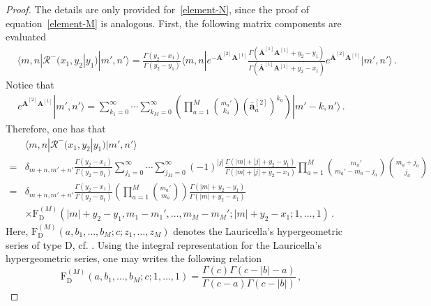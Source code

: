 \documentclass[11pt]{article}
\numberwithin{equation}{section}
\newcommand{\oad}{\mathbf{\bar{a}}}
\newcommand{\OF}{\mathbf{A}}
\newcommand{\OFD}{\mathbf{\bar{A}}}
\newcommand{\M}{M}
\newcommand{\eR}{\mathcal{R}}
\begin{document}
\begin{proof}
The details are only provided for~\eqref{element-N}, since the proof of equation~\eqref{element-M} is analogous. First, the following matrix components are evaluated
\begin{equation}
	\begin{split}
	&\langle m,n|{\eR}^{-}(x_1,y_{2}|y_{1})|m',n'\rangle
	=\frac{\Gamma(y_{2}-x_{1})}{\Gamma(y_{2}-y_{1})}
	\langle m, n|e^{-\OFD^{[2]}\OF^{[1]}}\frac{\Gamma(\OFD^{[1]}\OF^{[1]}+y_2-y_1)}{\Gamma(\OFD^{[1]}\OF^{[1]}+y_2-x_1)}e^{\OFD^{[2]}\OF^{[1]}}|m',n'\rangle\,.
	\end{split}
\end{equation}
Notice that
\begin{equation}
	\begin{split}
e^{\OFD^{[2]}\OF^{[1]}}|m',n'\rangle =\sum_{k_{1}=0}^{\infty}\cdots\sum_{k_{\M}=0}^{\infty}\left(\prod_{a=1}^{\M}\binom{m_{a}{'}}{k_{a}} \left(\oad_{a}^{[2]}\right)^{k_{a}}\right)|m'-k,n'\rangle \,.
	\end{split}
\end{equation}
Therefore, one has that
\begin{equation}
	\begin{split}
&\langle m,  n|{\eR}^{-}(x_{1},y_{2}|y_{1})|m',n'\rangle
\\=&
\delta_{m+n,m'+n'}\frac{\Gamma(y_{2}-x_{1})}{\Gamma(y_{2}-y_{1})}\sum_{j_{1}=0}^{\infty}\cdots\sum_{j_{\M}=0}^{\infty}(-1)^{|j|}\frac{\Gamma(|m|+|j|+y_{2}-y_{1})}{\Gamma(|m|+|j|+y_{2}-x_{1})}\prod_{a=1}^{\M}\binom{m_{a}{'}}{m_{a}{'}-m_{a}-j_{a}} \binom{m_{a}+j_{a}}{j_{a}}
\\=&
\delta_{m+n,m'+n'}\frac{\Gamma(y_{2}-x_{1})}{\Gamma(y_{2}-y_{1})}\left(\prod_{a=1}^{\M}\binom{m_{a}{'}}{m_{a}}\right)\frac{\Gamma(|m|+y_{2}-y_{1})}{\Gamma(|m|+y_{2}-x_{1})}
\\&\times\text{F}_{\text{D}}^{(\M)}(|m|+y_{2}-y_{1},m_{1}-m_{1}{'},\ldots,m_{\M}-m_{\M}{'};|m|+y_{2}-x_{1};1,\ldots,1)\,.
	\end{split}
\end{equation}
Here,  $\text{F}_{\text{D}}^{(\M)}(a,b_1,\ldots,b_\M;c;z_1,\ldots,z_\M)$ denotes the Lauricella's hypergeometric series of type D, cf. \cite{lauricella1893sulle}. Using the integral representation for the Lauricella's hypergeometric series, one may writes the following relation
\begin{equation}
	\text{F}_{\text{D}}^{(\M)}(a,b_{1},\ldots,b_{\M};c;1,\ldots,1)=\frac{\Gamma(c)\Gamma(c-|b|-a)}{\Gamma(c-a)\Gamma(c-|b|)}\,,
\end{equation}

\end{proof}
\end{document}
